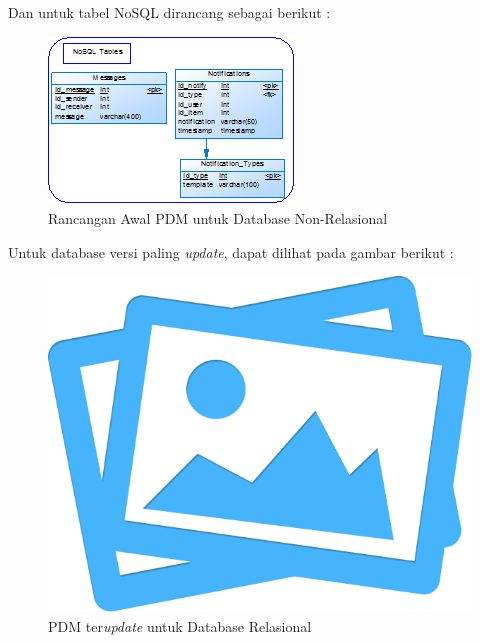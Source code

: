 	Dan untuk tabel NoSQL dirancang sebagai berikut :
	\begin{figure}[H]
		\centering
		\includegraphics[width=\textwidth]{images/bab3/db/pdm-nosql-awal.png}
		\caption{Rancangan Awal PDM untuk Database Non-Relasional}
		\label{pdm-nosql-awal}
	\end{figure}
	
	Untuk database versi paling \textit{update}, dapat dilihat pada gambar berikut :
	\begin{figure}[H]
		\centering
		\includegraphics[width=\textwidth]{images/no-image.png}
		\caption{PDM ter\textit{update} untuk Database Relasional}
		\label{pdm-final}
	\end{figure}
	
